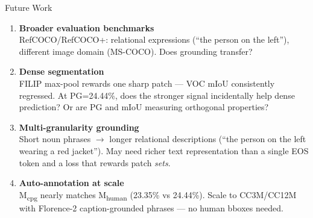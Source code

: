 \documentclass[aspectratio=169,12pt]{beamer}
\newcommand{\mhuman}{M\textsubscript{human}}
\newcommand{\mcpg}{M\textsubscript{cpg}}
\begin{document}
\begin{frame}{Future Work}
  \begin{enumerate}
    \item \textbf{Broader evaluation benchmarks}\\
          {\small RefCOCO/RefCOCO+: relational expressions (``the person on the left''), different image domain (MS-COCO). Does grounding transfer?}

    \vspace{0.5em}
    \item \textbf{Dense segmentation}\\
          {\small FILIP max-pool rewards one sharp patch — VOC mIoU consistently regressed. At PG=24.44\%, does the stronger signal incidentally help dense prediction? Or are PG and mIoU measuring orthogonal properties?}

    \vspace{0.5em}
    \item \textbf{Multi-granularity grounding}\\
          {\small Short noun phrases $\to$ longer relational descriptions (``the person on the left wearing a red jacket''). May need richer text representation than a single EOS token and a loss that rewards patch \emph{sets}.}

    \vspace{0.5em}
    \item \textbf{Auto-annotation at scale}\\
          {\small \mcpg{} nearly matches \mhuman{} (23.35\% vs 24.44\%). Scale to CC3M/CC12M with Florence-2 caption-grounded phrases — no human bboxes needed.}
  \end{enumerate}
\end{frame}
\end{document}
